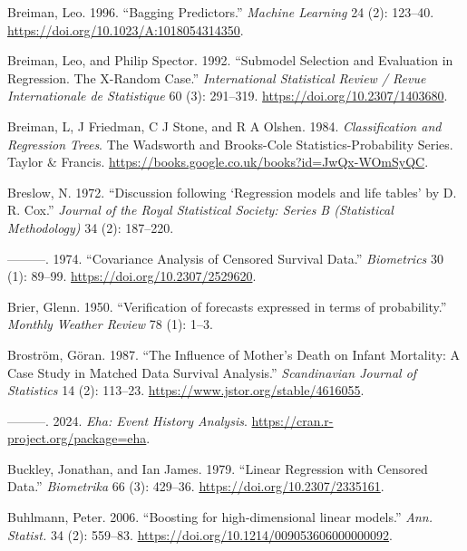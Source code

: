 \documentclass[
  letterpaper,
  krantz2]{style/krantz}
\newlength{\cslhangindent}
\newenvironment{CSLReferences}[2] %
 {\begin{list}{}{%
  \setlength{\itemindent}{0pt}
  \setlength{\leftmargin}{0pt}
  \setlength{\parsep}{0pt}
  \ifodd #1
   \setlength{\leftmargin}{\cslhangindent}
   \setlength{\itemindent}{-1\cslhangindent}
  \fi
  \setlength{\itemsep}{#2\baselineskip}}}
 {\end{list}}
\begin{document}
\begin{CSLReferences}{1}{0}
Breiman, Leo. 1996. {``{Bagging Predictors}.''} \emph{Machine Learning}
24 (2): 123--40. \url{https://doi.org/10.1023/A:1018054314350}.

Breiman, Leo, and Philip Spector. 1992. {``{Submodel Selection and
Evaluation in Regression. The X-Random Case}.''} \emph{International
Statistical Review / Revue Internationale de Statistique} 60 (3):
291--319. \url{https://doi.org/10.2307/1403680}.

Breiman, L, J Friedman, C J Stone, and R A Olshen. 1984.
\emph{{Classification and Regression Trees}}. The Wadsworth and
Brooks-Cole Statistics-Probability Series. Taylor \& Francis.
\url{https://books.google.co.uk/books?id=JwQx-WOmSyQC}.

Breslow, N. 1972. {``{Discussion following {`Regression models and life
tables'} by D. R. Cox}.''} \emph{Journal of the Royal Statistical
Society: Series B (Statistical Methodology)} 34 (2): 187--220.

---------. 1974. {``Covariance {Analysis} of {Censored Survival
Data}.''} \emph{Biometrics} 30 (1): 89--99.
\url{https://doi.org/10.2307/2529620}.

Brier, Glenn. 1950. {``{Verification of forecasts expressed in terms of
probability}.''} \emph{Monthly Weather Review} 78 (1): 1--3.

Broström, Göran. 1987. {``The {Influence} of {Mother}'s {Death} on
{Infant Mortality}: {A Case Study} in {Matched Data Survival
Analysis}.''} \emph{Scandinavian Journal of Statistics} 14 (2): 113--23.
\url{https://www.jstor.org/stable/4616055}.

---------. 2024. \emph{Eha: Event History Analysis}.
\url{https://cran.r-project.org/package=eha}.

Buckley, Jonathan, and Ian James. 1979. {``{Linear Regression with
Censored Data}.''} \emph{Biometrika} 66 (3): 429--36.
\url{https://doi.org/10.2307/2335161}.

Buhlmann, Peter. 2006. {``{Boosting for high-dimensional linear
models}.''} \emph{Ann. Statist.} 34 (2): 559--83.
\url{https://doi.org/10.1214/009053606000000092}.


\end{CSLReferences}
\end{document}
